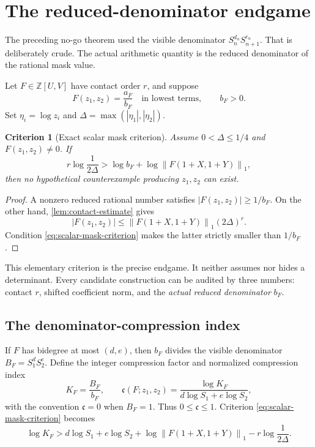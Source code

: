 \documentclass[11pt,oneside]{article}
\newtheorem{criterion}[theorem]{Criterion}
\theoremstyle{definition}
\theoremstyle{remark}
\newcommand{\Z}{\mathbb Z}
\newcommand{\normone}[1]{\left\lVert #1\right\rVert_1}
\begin{document}
\section{The reduced-denominator endgame}
\label{sec:endgame}

The preceding no-go theorem used the visible denominator
$S_n^{d_n}S_{n+1}^{e_n}$.  That is deliberately crude.  The actual arithmetic quantity is
the reduced denominator of the rational mask value.

Let $F\in\Z[U,V]$ have contact order $r$, and suppose
\[
 F(z_1,z_2)=\frac{a_F}{b_F}
 \quad\text{in lowest terms},
 \qquad b_F>0.
\]
Set $\eta_i=\log z_i$ and $\Delta=\max(|\eta_1|,|\eta_2|)$.

\begin{criterion}[Exact scalar mask criterion]
\label{crit:scalar-mask}
Assume $0<\Delta\le1/4$ and $F(z_1,z_2)\ne0$.  If
\begin{equation}
 r\log\frac1{2\Delta}
 >\log b_F+\log\normone{F(1+X,1+Y)},
 \label{eq:scalar-mask-criterion}
\end{equation}
then no hypothetical counterexample producing $z_1,z_2$ can exist.
\end{criterion}

\begin{proof}
A nonzero reduced rational number satisfies $|F(z_1,z_2)|\ge1/b_F$.  On the other hand,
\cref{lem:contact-estimate} gives
\[
 |F(z_1,z_2)|
 \le\normone{F(1+X,1+Y)}(2\Delta)^r.
\]
Condition \eqref{eq:scalar-mask-criterion} makes the latter strictly smaller than $1/b_F$.
\end{proof}

This elementary criterion is the precise endgame.  It neither assumes nor hides a determinant.
Every candidate construction can be audited by three numbers: contact $r$, shifted coefficient
norm, and the \emph{actual reduced denominator} $b_F$.

\subsection{The denominator-compression index}

If $F$ has bidegree at most $(d,e)$, then $b_F$ divides the visible denominator
$B_F=S_1^dS_2^e$.  Define the integer compression factor and normalized compression index
\begin{equation}
 K_F=\frac{B_F}{b_F},
 \qquad
 \mathfrak c(F;z_1,z_2)=
 \frac{\log K_F}{d\log S_1+e\log S_2},
 \label{eq:compression-index}
\end{equation}
with the convention $\mathfrak c=0$ when $B_F=1$.  Thus $0\le\mathfrak c\le1$.
Criterion \eqref{eq:scalar-mask-criterion} becomes
\begin{equation}
 \log K_F>
 d\log S_1+e\log S_2
 +\log\normone{F(1+X,1+Y)}
 -r\log\frac1{2\Delta}.
 \label{eq:compression-threshold}
\end{equation}
\end{document}
